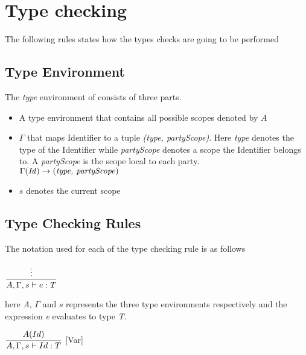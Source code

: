 
\section{Type checking}
The following rules states how the types checks are going to be performed
\subsection{Type Environment} The \textit{type} environment of \langName{} consists of three parts.

\begin{itemize}
    \item A type environment that contains all possible scopes denoted by $A$

    \item $\Gamma$ that maps Identifier to a tuple \textit{(type, partyScope)}. Here \textit{type}
        denotes the type of the Identifier while \textit{partyScope} denotes a scope the Identifier
        belongs to.  A \textit{partyScope} is the scope local to each party.
        \\$\Gamma(\text{\textit{Id}}) \rightarrow (\text{\textit{type, partyScope}})$

    \item $s$ denotes the current scope
\end{itemize}

\subsection{Type Checking Rules}
The notation used for each of the type checking rule is as follows

\hspace*{10em} $ \dfrac{\vdots}{A, \Gamma, s \vdash{} e: T}$ \smallskip

here \textit{A}, $\Gamma$ and $s$ represents the three
type environments respectively and
the expression \textit{e} evaluates to type \textit{T}.\bigskip


\hspace*{10em} $ \dfrac{A(Id)}{A, \Gamma, s \vdash{} Id: T}$ [Var] \bigskip

